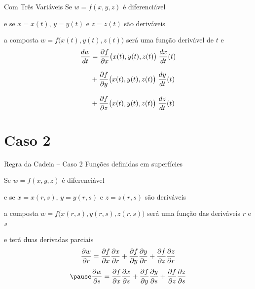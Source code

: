 \begin{frame}{Com Três Variáveis}
    Se \(w=f(x, y, z)\) é diferenciável

    \pause
     \vspace{0.5\baselineskip}
     e se \(x=x(t)\), \(y=y(t)\) e \(z=z(t)\) são deriváveis

    \pause
    \vspace{0.5\baselineskip}
    a composta \(w=f\big(x(t), y(t), z(t)\big)\) será uma função derivável de $t$ e
    \pause
    \begin{align*}
        \frac{dw}{dt}
        & = \frac{\partial {f}}{\partial {x}}\big(x(t), y(t), z(t)\big) \; \frac{dx}{dt}(t) \\[3mm]
        & + \frac{\partial {f}}{\partial {y}}\big(x(t), y(t), z(t)\big) \; \frac{dy}{dt}(t) \\[3mm]
        & + \frac{\partial {f}}{\partial {z}}\big(x(t), y(t), z(t)\big) \; \frac{dz}{dt}(t)
    \end{align*}
\end{frame}


\section{Caso 2}

\begin{frame}{Regra da Cadeia -- Caso 2 }
    Funções definidas em superfícies
    \vspace{\baselineskip}

    \pause
    Se \(w=f(x, y, z)\) é diferenciável

    \pause
    \vspace{0.2\baselineskip}
    e se \(x=x(r, s)\), \(y=y(r, s)\) e \(z=z(r, s)\) são deriváveis

    \pause
    \vspace{0.2\baselineskip}
    a composta \(w=f\big(x(r, s), y(r, s), z(r, s)\big)\)
    será uma função das deriváveis $r$ e $s$

    \pause
    \vspace{0.2\baselineskip}
    e terá duas derivadas parciais
    \[
        \frac{\partial {w}}{\partial {r}}
        = \frac{\partial {f}}{\partial {x}} \frac{\partial {x}}{\partial {r}}
        + \frac{\partial {f}}{\partial {y}} \frac{\partial {y}}{\partial {r}}
        + \frac{\partial {f}}{\partial {z}} \frac{\partial {z}}{\partial {r}}
    \]
    \[
        \pause
        \D{w}{s}
        = \D{f}{x} \D{x}{s}
        + \D{f}{y} \D{y}{s}
        + \D{f}{z} \D{z}{s}
    \]
\end{frame}


